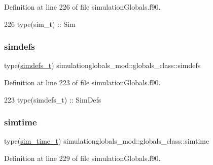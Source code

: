 Definition at line 226 of file simulation\+Globals.\+f90.


\begin{DoxyCode}
226         \textcolor{keywordtype}{type}(sim\_t)         :: Sim
\end{DoxyCode}
\mbox{\label{structsimulationglobals__mod_1_1globals__class_aaf8f2208dd36873709a0cc4f8f5862b3}} 
\subsubsection{\texorpdfstring{simdefs}{simdefs}}
{\footnotesize\ttfamily type(\mbox{\hyperlink{structsimulationglobals__mod_1_1simdefs__t}{simdefs\+\_\+t}}) simulationglobals\+\_\+mod\+::globals\+\_\+class\+::simdefs\hspace{0.3cm}{\ttfamily [private]}}



Definition at line 223 of file simulation\+Globals.\+f90.


\begin{DoxyCode}
223         \textcolor{keywordtype}{type}(simdefs\_t)     :: SimDefs
\end{DoxyCode}
\mbox{\label{structsimulationglobals__mod_1_1globals__class_a81dbc69f00c2af7f51f4b2fd962f9297}} 
\subsubsection{\texorpdfstring{simtime}{simtime}}
{\footnotesize\ttfamily type(\mbox{\hyperlink{structsimulationglobals__mod_1_1sim__time__t}{sim\+\_\+time\+\_\+t}}) simulationglobals\+\_\+mod\+::globals\+\_\+class\+::simtime\hspace{0.3cm}{\ttfamily [private]}}



Definition at line 229 of file simulation\+Globals.\+f90.


